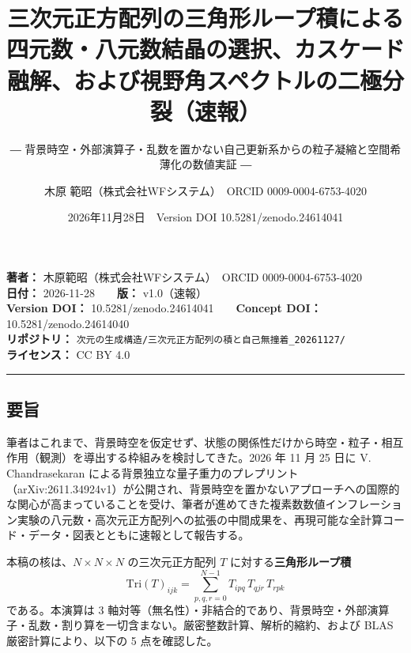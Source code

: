 \documentclass[
  a4paper,
]{ltjsarticle}
\title{三次元正方配列の三角形ループ積による四元数・八元数結晶の選択、カスケード融解、および視野角スペクトルの二極分裂（速報）}
\subtitle{―
背景時空・外部演算子・乱数を置かない自己更新系からの粒子凝縮と空間希薄化の数値実証
―}
\author{木原 範昭（株式会社WFシステム）　ORCID 0009-0004-6753-4020}
\date{2026年11月28日　Version DOI 10.5281/zenodo.24614041}
\begin{document}
\maketitle

\textbf{著者：} 木原範昭（株式会社WFシステム）　ORCID
0009-0004-6753-4020\\
\textbf{日付：} 2026-11-28　　\textbf{版：} v1.0（速報）\\
\textbf{Version DOI：} 10.5281/zenodo.24614041　　\textbf{Concept DOI：}
10.5281/zenodo.24614040\\
\textbf{リポジトリ：}
\texttt{次元の生成構造/\allowbreak{}三次元正方配列の積と自己無撞着\_\allowbreak{}20261127/\allowbreak{}}\\
\textbf{ライセンス：} CC BY 4.0

\begin{center}\rule{0.5\linewidth}{0.5pt}\end{center}

\subsection{要旨}\label{ux8981ux65e8}

筆者はこれまで、背景時空を仮定せず、状態の関係性だけから時空・粒子・相互作用（観測）を導出する枠組みを検討してきた。2026
年 11 月 25 日に V. Chandrasekaran
による背景独立な量子重力のプレプリント（arXiv:2611.34924v1）が公開され、背景時空を置かないアプローチへの国際的な関心が高まっていることを受け、筆者が進めてきた複素数数値インフレーション実験の八元数・高次元正方配列への拡張の中間成果を、再現可能な全計算コード・データ・図表とともに速報として報告する。

本稿の核は、\(N \times N \times N\) の三次元正方配列 \(T\)
に対する\textbf{三角形ループ積}
\[\mathrm{Tri}(T)_{ijk} = \sum_{p,q,r=0}^{N-1} T_{ipq}\, T_{qjr}\, T_{rpk}\]
である。本演算は 3
軸対等（無名性）・非結合的であり、背景時空・外部演算子・乱数・割り算を一切含まない。厳密整数計算、解析的縮約、および
BLAS 厳密計算により、以下の 5 点を確認した。
\end{document}
